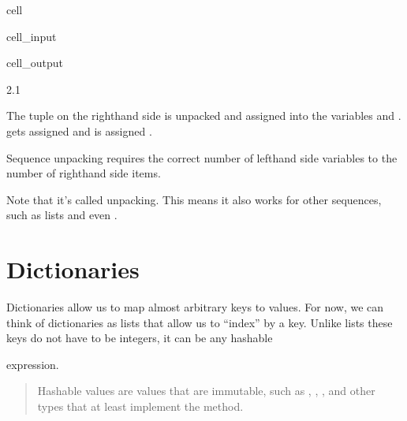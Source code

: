 \documentclass[letterpaper,10pt,english]{jupyterBook}
\begin{document}
\begin{sphinxuseclass}{cell}\begin{sphinxVerbatimInput}

\begin{sphinxuseclass}{cell_input}
\begin{sphinxVerbatim}[commandchars=\\\{\}]
  
\end{sphinxVerbatim}

\end{sphinxuseclass}\end{sphinxVerbatimInput}
\begin{sphinxVerbatimOutput}

\begin{sphinxuseclass}{cell_output}
\begin{sphinxVerbatim}[commandchars=\\\{\}]
2.1
\end{sphinxVerbatim}

\end{sphinxuseclass}\end{sphinxVerbatimOutput}

\end{sphinxuseclass}
\sphinxAtStartPar
The tuple on the right\sphinxhyphen{}hand side is unpacked and assigned into the variables  and .
 gets assigned  and  is assigned .

\sphinxAtStartPar
Sequence unpacking requires the correct number of left\sphinxhyphen{}hand side variables to the number of right\sphinxhyphen{}hand side items.

\sphinxAtStartPar
Note that it’s called  unpacking.
This means it also works for other sequences, such as lists and even .


\section{Dictionaries}
\label{\detokenize{datatypes:dictionaries}}
\sphinxAtStartPar
Dictionaries allow us to map almost arbitrary keys to values.
For now, we can think of dictionaries as lists that allow us to “index” by a key. Unlike lists these keys do not have to be integers, it can be any hashable%
\begin{footnote}[1]\sphinxAtStartFootnote
{}
%
\end{footnote} expression.
\begin{quote}

\sphinxAtStartPar
Hashable values are values that are immutable, such as , , , and other types that at least implement the  method.
\end{quote}
\end{document}
